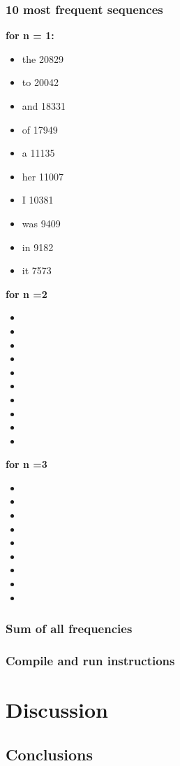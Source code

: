 \documentclass[final,12pt]{elsarticle}
\begin{document}
\subsubsection{10 most frequent sequences}
\textbf{for n = 1:}
\begin{itemize}
\item the 20829
\item to 20042
\item and 18331 
\item of 17949
\item a 11135
\item her 11007
\item I 10381
\item was 9409
\item in 9182 
\item it 7573
\end{itemize}
\textbf{for n =2}
\begin{itemize}
\item 
\item 
\item 
\item 
\item 
\item 
\item 
\item 
\item 
\item 
\end{itemize}
\textbf{for n =3}
\begin{itemize}
\item 
\item
\item
\item
\item
\item
\item
\item
\item
\end{itemize}
\subsubsection{Sum of all frequencies}
\subsubsection{Compile and run instructions}
\section{Discussion}
\subsection{Conclusions}
\end{document}

